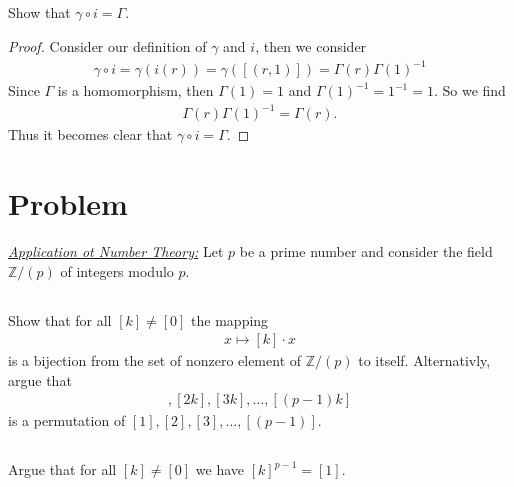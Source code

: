 \documentclass[10pt]{amsart}
\newcommand{\Z}{\mathbb{Z}}
\begin{document}
\subsection{}%
\label{sub:2c}

Show that $\gamma\circ i=\Gamma$.

\begin{proof}
  Consider our definition of $\gamma$ and $i$, then we consider
  \begin{align*}
    \gamma\circ i = \gamma(i(r))=\gamma([(r,1)])=\Gamma(r){\Gamma(1)}^{-1}
  \end{align*}
  Since $\Gamma$ is a homomorphism, then $\Gamma(1)=1$ and
  ${\Gamma(1)}^{-1}=1^{-1}=1$. So we find
  \begin{align*}
    \Gamma(r){\Gamma(1)}^{-1}=\Gamma(r).
  \end{align*}
  Thus it becomes clear that $\gamma\circ i=\Gamma$.
\end{proof}

\section{Problem}%
\label{sec:problem_3}

\underline{\textit{Application ot Number Theory:}} Let $p$ be a prime number
and consider the field $\Z/(p)$ of integers modulo $p$.

\subsection{}%
\label{sub:3a}

Show that for all $[k]\neq[0]$ the mapping
\begin{align*}
  x\mapsto[k]\cdot x
\end{align*}
is a bijection from the set of nonzero element of $\Z/(p)$ to itself.
Alternativly, argue that
\begin{align*}
  [k],[2k],[3k],\ldots,[(p-1)k]
\end{align*}
is a permutation of $[1],[2],[3],\ldots,[(p-1)]$.


\subsection{}%
\label{sub:3b}

Argue that for all $[k]\neq [0]$ we have ${[k]}^{p-1}=[1]$.
\end{document}
